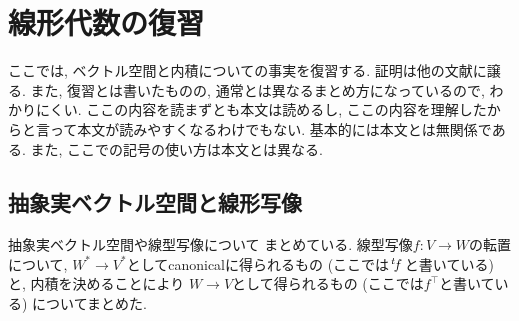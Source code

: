 
\chapter{線形代数の復習}
ここでは, ベクトル空間と内積についての事実を復習する.
証明は他の文献に譲る.
また, 復習とは書いたものの,
通常とは異なるまとめ方になっているので,
わかりにくい.
ここの内容を読まずとも本文は読めるし,
ここの内容を理解したからと言って本文が読みやすくなるわけでもない.
基本的には本文とは無関係である.
また, ここでの記号の使い方は本文とは異なる.


\section{抽象実ベクトル空間と線形写像}
抽象実ベクトル空間や線型写像について
まとめている.
線型写像$f\colon V\to W$の転置について,
$W^\ast\to V^\ast$としてcanonicalに得られるもの
(ここでは$\left.^{t}\!f\right.$と書いている)
と,
内積を決めることにより
$W\to V$として得られるもの
(ここでは$f^\top$と書いている)
についてまとめた.
